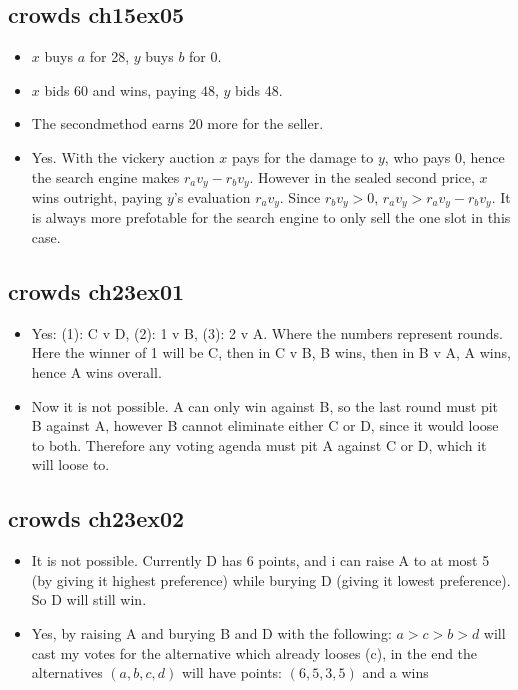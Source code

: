 \documentclass{article}
\begin{document}
\subsection{crowds ch15ex05}
\begin{itemize}
	\item $x$ buys $a$ for 28, $y$ buys $b$ for 0.
	\item $x$ bids 60 and wins, paying $48$, $y$ bids 48.
	\item The secondmethod earns 20 more for the seller.
	\item Yes.
			With the vickery auction $x$ pays for the damage to $y$, who pays 0, hence the search engine makes $r_a v_y - r_b v_y$.
			However in the sealed second price, $x$ wins outright, paying $y$'s evaluation $r_a v_y$.
			Since $r_b v_y > 0$, $r_a v_y > r_a v_y - r_b v_y$.
			It is always more prefotable for the search engine to only sell the one slot in this case.
\end{itemize}

\subsection{crowds ch23ex01}
\begin{itemize}
	\item Yes: (1): C v D, (2): 1 v B, (3): 2 v A.
			Where the numbers represent rounds.
			Here the winner of 1 will be C, then in C v B, B wins, then in B v A, A wins, hence A wins overall.
	\item Now it is not possible.
			A can only win against B, so the last round must pit B against A, however B cannot eliminate either C or D, since it would loose to both.
			Therefore any voting agenda must pit A against C or D, which it will loose to.
\end{itemize}

\subsection{crowds ch23ex02}
\begin{itemize}
	\item It is not possible.
		Currently D has 6 points, and i can raise A to at most 5 (by giving it highest preference) while burying D (giving it lowest preference). So D will still win.
	\item Yes, by raising A and burying B and D with the following: $a > c > b > d$ will cast my votes for the alternative which already looses (c), in the end the alternatives $(a, b, c, d)$ will have points: $(6, 5, 3, 5)$ and a wins
\end{itemize}
\end{document}
